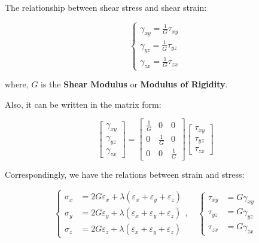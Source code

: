 \documentclass[en,hazy,cyan,8pt,normal]{elegantnote}
\numberwithin{equation}{section}
\begin{document}
    The relationship between shear stress and shear strain:

    \begin{equation}\label{eq:061}
      \left\{
      \begin{aligned}
        \gamma_{xy} = \frac{1}{G} \tau_{xy} \\
        \gamma_{yz} = \frac{1}{G} \tau_{yz} \\
        \gamma_{zx} = \frac{1}{G} \tau_{zx}
      \end{aligned}
      \right.
    \end{equation}

    where, $G$ is the \textbf{Shear Modulus} or \textbf{Modulus of Rigidity}.

    Also, it can be written in the matrix form:

    \begin{equation}\label{eq:062}
      \begin{bmatrix}
        \gamma_{xy} \\
        \gamma_{yz} \\
        \gamma_{zx}
      \end{bmatrix}
      =
      \begin{bmatrix}
        \frac{1}{G} & 0 & 0 \\
        0 & \frac{1}{G} & 0 \\
        0 & 0 & \frac{1}{G}
      \end{bmatrix}
      \begin{bmatrix}
        \tau_{xy} \\
        \tau_{yz} \\
        \tau_{zx}
      \end{bmatrix}
    \end{equation}

    Correspondingly, we have the relations between strain and stress:

    \begin{equation}\label{eq:064}
      \left\{
      \begin{aligned}
        \sigma_x &= 2G \varepsilon_x + \lambda(\varepsilon_x + \varepsilon_y + \varepsilon_z) \\
        \sigma_y &= 2G \varepsilon_y + \lambda(\varepsilon_x + \varepsilon_y + \varepsilon_z) \\
        \sigma_z &= 2G \varepsilon_z + \lambda(\varepsilon_x + \varepsilon_y + \varepsilon_z)
      \end{aligned}
      \right.
      , \quad
      \left\{
      \begin{aligned}
        \tau_{xy} &= G \gamma_{xy} \\
        \tau_{yz} &= G \gamma_{yz} \\
        \tau_{zx} &= G \gamma_{zx}
      \end{aligned}
      \right.
    \end{equation}
\end{document}

